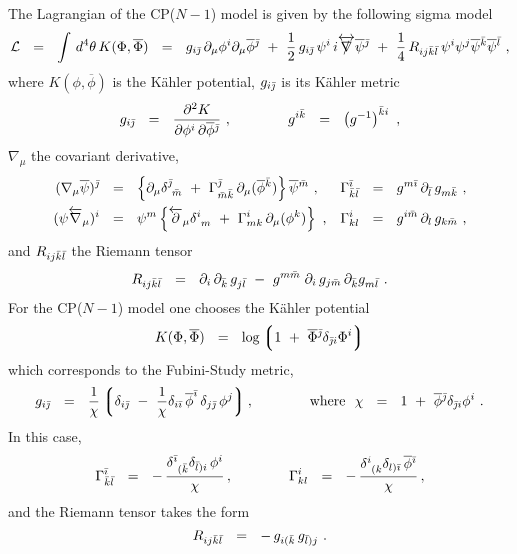 \documentclass[12pt]{article}
\newcommand{\p}{\partial}
\newcommand{\ov}{\overline}
\newcommand{\mc}[1]{\mathcal{#1}}
\newcommand{\lgr}{\left\lgroup}
\newcommand{\rgr}{\right\rgroup}
\def\slashed#1{\setbox0=\hbox{$#1$}             %
   \dimen0=\wd0                                 %
   \setbox1=\hbox{/} \dimen1=\wd1               %
   \ifdim\dimen0>\dimen1                        %
      \rlap{\hbox to \dimen0{\hfil/\hfil}}      %
      #1                                        %
   \else                                        %
      \rlap{\hbox to \dimen1{\hfil$#1$\hfil}}   %
      /                                         %
   \fi}                                        %
\begin{document}
	The Lagrangian of the CP($N-1$) model is given by the following sigma model
\[
	\mc{L} ~~=~~ \int\, d^4\theta\, K(\Phi,\ov{\Phi}) ~~=~~ g_{i\bj}\,\p_\mu \phi^i \p_\mu\ov{\phi}{}^\bj
		~+~ \frac{1}{2}\, g_{i\bj}\, \psi^i\, i\overleftrightarrow{\slashed{\nabla}} \ov{\psi}{}^\bj 
		~+~ \frac{1}{4}\, R_{ij\bk\bl}\, \psi^i\psi^j \ov{\psi}{}^\bk \ov{\psi}{}^\bl~,
\]
	where $ K(\phi,\ov{\phi}) $ is the K\"ahler potential, 
	$ g_{i{\bar \jmath}} $ is its K\"ahler metric
\[
	g_{i\bj} ~~=~~ \frac{\p^2 K}{\p\phi^i\,{\p\ov{\phi}{}^\bj}}~,
	\qquad\qquad
	g^{i\bk} ~~=~~ \left(g^{-1}\right)^{\bk i}~,
\]
	$ \nabla_\mu $ the covariant derivative,
\begin{align*}
% 
	(\nabla_\mu \ov{\psi})^\bj & ~~=~~ \left\{ \p_\mu \delta^\bj_{\ \bm} ~+~
						\Gamma_{\bm\bk}^\bj\, \p_\mu(\ov{\phi}{}^\bk) \right\} \ov{\psi}{}^\bm~,
	& \Gamma^\bi_{\bk\bl} & ~~=~~ g^{m\bi}\,\p_\bl\, g_{m\bk}~,
	\\
%
	(\psi \overleftarrow{\nabla}{}_\mu)^i & ~~=~~ 
			\psi^m \left\{ \overleftarrow{\p}{}_\mu\delta^i_{\ m} ~+~
						\Gamma^i_{mk}\, \p_\mu(\phi^k) \right\}~,
	& \Gamma^i_{kl} & ~~=~~ g^{i\bm}\, \p_l\, g_{k\bm}~,
\end{align*}
	and $ R_{ij{\bar k}{\bar l}} $ the Riemann tensor 
\[
	R_{ij\bk\bl} ~~=~~ \p_i\,\p_\bk\, g_{j\bl} ~-~ g^{m\bm}\; \p_i\, g_{j\bm}\, \p_\bk g_{m\bl}~.
\]
	For the CP($N-1$) model one chooses the K\"ahler potential
\[
	K(\Phi, \ov{\Phi}) ~~=~~ \log \lgr 1 ~+~ \ov{\Phi}{}^\bj \delta_{\bj i} \Phi^i \rgr
\]
	which corresponds to the Fubini-Study metric,
\[
	g_{i\bj} ~~=~~ \frac{1}{\chi}\lgr  \delta_{i\bj} ~-~ \frac{1}{\chi}
				  \delta_{i\bi}\,\ov{\phi}^\bi\, \delta_{j\bj}\,\phi^j \rgr,
	\qquad\qquad \text{where~~}
	\chi ~~=~~ 1 ~+~ \ov{\phi}{}^\bj \delta_{\bj i} \phi^i~.
\]
	In this case,
\[
	\Gamma^\bi_{\bk\bl} ~~=~~ -\, \frac{\delta^\bi_{\ (\bk} \delta_{\bl) i}\, \phi^i}{\chi}\,,  
	\qquad\qquad 
	\Gamma^i_{kl} ~~=~~ -\, \frac{\delta^i_{\ (k} \delta_{l)\bi}\,\ov{\phi}{}^\bi}{\chi}\,,
\]
	and the Riemann tensor takes the form
\[
	R_{ij{\bar k}{\bar l}} ~~=~~ -\,g_{i({\bar k}}\,g_{{\bar l})j}~.
\]
	
\end{document}
